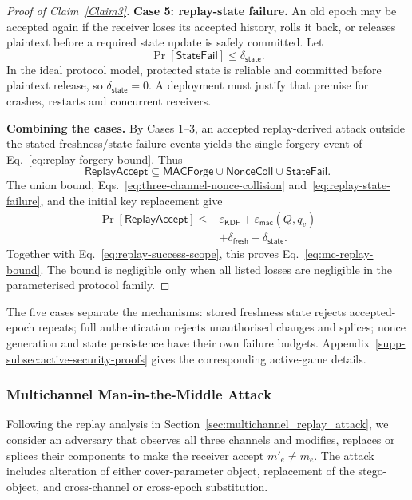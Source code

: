 \documentclass[pdflatex,sn-mathphys-num]{sn-jnl}%
\theoremstyle{definition}
\theoremstyle{game}
\theoremstyle{thmstyleone}%
\theoremstyle{thmstyletwo}%
\theoremstyle{thmstylethree}%
\begin{document}
\begin{proof}[Proof of Claim~\ref{Claim3}]
\textbf{Case 5: replay-state failure.}
An old epoch may be accepted again if the receiver loses its accepted
history, rolls it back, or releases plaintext before a required state
update is safely committed. Let
\begin{equation}\label{eq:replay-state-failure}
\Pr[\mathsf{StateFail}]\le\delta_{\mathsf{state}}.
\end{equation}
In the ideal protocol model, protected state is reliable and committed
before plaintext release, so $\delta_{\mathsf{state}}=0$. A deployment
must justify that premise for crashes, restarts and concurrent receivers.

\textbf{Combining the cases.}
By Cases 1--3, an accepted replay-derived attack outside the stated
freshness/state failure events yields the single forgery event of
Eq.~\eqref{eq:replay-forgery-bound}. Thus
\begin{equation}\label{eq:replay-event-decomposition}
\mathsf{ReplayAccept}\subseteq
\mathsf{MACForge}\cup\mathsf{NonceColl}\cup\mathsf{StateFail}.
\end{equation}
The union bound, Eqs.~\eqref{eq:three-channel-nonce-collision}
and~\eqref{eq:replay-state-failure}, and the initial key replacement give
\begin{align}\label{eq:replay-combined-cases}
\Pr[\mathsf{ReplayAccept}]
\le{}&\varepsilon_{\mathsf{KDF}}+\varepsilon_{\mathsf{mac}}(Q,q_v)
\nonumber\\
&+\delta_{\mathsf{fresh}}+\delta_{\mathsf{state}}.
\end{align}
Together with Eq.~\eqref{eq:replay-success-scope}, this proves
Eq.~\eqref{eq:mc-replay-bound}. The bound is negligible only when all
listed losses are negligible in the parameterised protocol family.
\end{proof}

\noindent The five cases separate the mechanisms: stored freshness state
rejects accepted-epoch repeats; full authentication rejects unauthorised
changes and splices; nonce generation and state persistence have their own
failure budgets. Appendix~\ref{supp-subsec:active-security-proofs} gives the
corresponding active-game details.

\subsubsection{Multichannel Man-in-the-Middle Attack}
\label{Multichannel Man-in-the-Middle Attack}

Following the replay analysis in Section~\ref{sec:multichannel_replay_attack},
we consider an adversary that observes all three channels and modifies,
replaces or splices their components to make the receiver accept
$m'_e\ne m_e$. The attack includes alteration of either cover-parameter
object, replacement of the stego-object, and cross-channel or cross-epoch
substitution.
\end{document}
